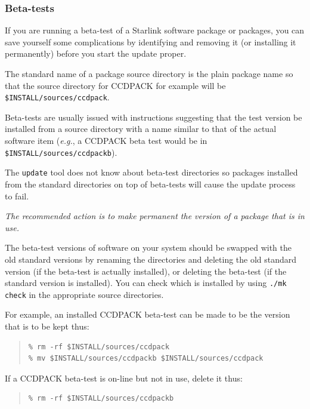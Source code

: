 \documentclass[twoside,11pt]{article}
\renewcommand{\_}{\texttt{\symbol{95}}}
\begin{document}
\subsubsection{Beta-tests}

If you are running a beta-test of a Starlink software package or packages,
you can save yourself some complications by identifying and removing it
(or installing it permanently) before you start the update proper.

The standard name of a package source directory is the plain package
name so that the source directory for CCDPACK for example will be
\texttt{\$INSTALL/sources/ccdpack}.

Beta-tests are usually issued with instructions suggesting that the test
version be installed from a source directory with a name similar to that
of the actual software item (\emph{e.g.}, a CCDPACK beta test would be
in \texttt{\$INSTALL/sources/ccdpackb}).

The \texttt{update} tool does not know about beta-test directories so
packages installed from the standard directories on top of beta-tests
will cause the update process to fail.

\emph{The recommended action is to make permanent the version of a package 
that is in use.}

The beta-test versions of software on your system should be swapped with the
old standard versions by renaming the directories and deleting the old
standard version (if the beta-test is actually installed), or deleting the
beta-test (if the standard version is installed).  You can check which is
installed by using \texttt{./mk check} in the appropriate source
directories.

For example, an installed CCDPACK beta-test can be made to be the
version that is to be kept thus:

\begin{quote}
\begin{verbatim}
% rm -rf $INSTALL/sources/ccdpack
% mv $INSTALL/sources/ccdpackb $INSTALL/sources/ccdpack
\end{verbatim}
\end{quote}

If a CCDPACK beta-test is on-line but not in use, delete it thus:

\begin{quote}
\begin{verbatim}
% rm -rf $INSTALL/sources/ccdpackb
\end{verbatim}
\end{quote}
\end{document}
